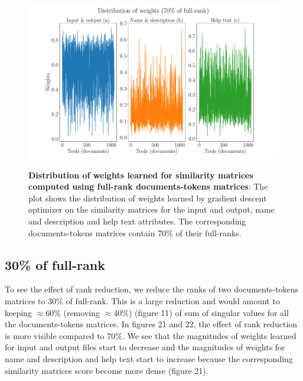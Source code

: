 \begin{figure}[h]
\begin{centering}
    {\includegraphics[scale=0.35]{figures/Weights_070.pdf}}
    \caption[Distribution of weights learned for similarity matrices computed using documents-tokens matrices reduced to 70\% of their full-rank]{\textbf{Distribution of weights learned for similarity matrices computed using full-rank documents-tokens matrices}: The plot shows the distribution of weights learned by gradient descent optimizer on the similarity matrices for the input and output, name and description and help text attributes. The corresponding documents-tokens matrices contain 70\% of their full-ranks.}
\end{centering}
\end{figure}

\subsection{30\% of full-rank}
To see the effect of rank reduction, we reduce the ranks of two documents-tokens matrices to 30\% of full-rank. This is a large reduction and would amount to keeping $\approx 60\%$ (removing $\approx 40\%$) (figure 11) of sum of singular values for all the documents-tokens matrices. In figures 21 and 22, the effect of rank reduction is more visible compared to $70\%$. We see that the magnitudes of weights learned for input and output files start to decrease and the magnitudes of weights for name and description and help text start to increase because the corresponding similarity matrices score become more dense (figure 21). 

